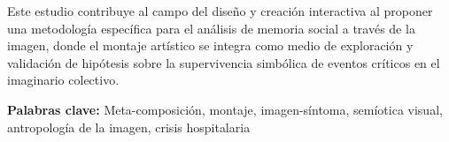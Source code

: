 Este estudio contribuye al campo del diseño y creación interactiva al proponer una metodología específica para el análisis de memoria social a través de la imagen, donde el montaje artístico se integra como medio de exploración y validación de hipótesis sobre la supervivencia simbólica de eventos críticos en el imaginario colectivo.

\vspace{1cm}
\textbf{Palabras clave:} \textcolor{edit30sept}{Meta-composición, montaje, imagen-síntoma, semíotica visual, antropología de la imagen, crisis hospitalaria}   
\pagebreak
